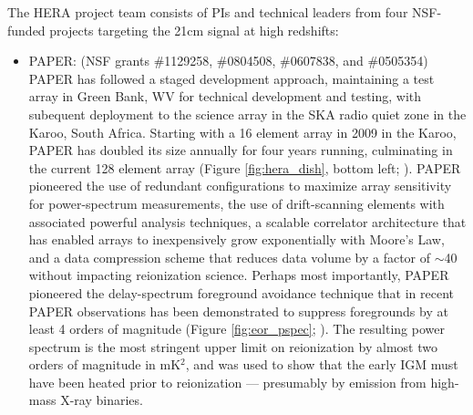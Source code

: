\documentclass[preprint]{aastex}
\begin{document}
The HERA project team consists of PIs and technical leaders from four NSF-funded projects targeting the 21cm signal
at high redshifts:
\begin{itemize}[noitemsep,nolistsep]

\item{PAPER:} (NSF grants \#1129258, \#0804508, \#0607838, and \#0505354) PAPER has followed a
staged development approach, maintaining a test array in Green Bank, WV for technical development and testing, with subequent 
deployment to the science array in the SKA radio quiet zone in the Karoo, South Africa.  Starting with a 16 element
array in 2009 in the Karoo, PAPER has doubled its size annually for four years running, culminating in the current
128 element array (Figure \ref{fig:hera_dish}, bottom left; \citealt{parsons_et_al2012a}).  
PAPER pioneered the use of redundant configurations
to maximize array sensitivity for power-spectrum measurements, the use of drift-scanning elements with associated powerful
analysis techniques, a scalable correlator architecture that has enabled arrays to inexpensively grow exponentially
with Moore's Law, and a data compression scheme that reduces data volume by a factor of $\sim$40 without impacting
reionization science.  Perhaps most importantly, PAPER pioneered the delay-spectrum foreground avoidance technique \cite{parsons_et_al2012b}
that in recent PAPER observations has been demonstrated to suppress foregrounds by at least 4 orders of magnitude 
(Figure \ref{fig:eor_pspec}; \citealt{parsons_et_al2013}).  The resulting power spectrum is the most stringent upper
limit on reionization by almost two orders of magnitude in mK$^2$, and was used to show that the early IGM must have
been heated prior to reionization --- presumably by emission from high-mass X-ray binaries.


\end{itemize}
\end{document}
